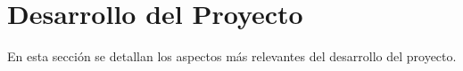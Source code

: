 \section{Desarrollo del Proyecto}
En esta sección se detallan los aspectos más relevantes del desarrollo del proyecto.



\pagebreak